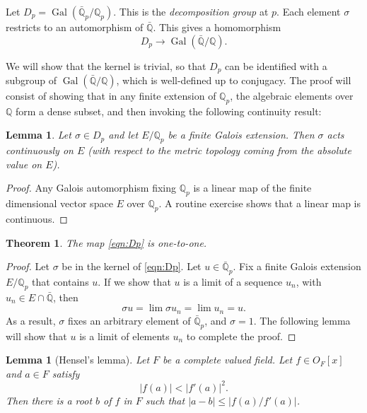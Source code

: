 \documentclass{amsart}
\def\op#1{{\operatorname{#1}}}
\newcommand{\ring}[1]{\mathbb{#1}}
\newtheorem{theorem}[equation]{Theorem}
\newtheorem{lemma}[equation]{Lemma}
\def\newterm#1{{\it #1}}
\def\abs#1{{|#1|}}
\begin{document}
Let $D_p = \op{Gal}(\bar{\ring{Q}}_p/\ring{Q}_p)$.  This is the
\newterm{decomposition group} at $p$.  Each element $\sigma$ restricts
to an automorphism of $\bar{\ring{Q}}$.  This gives a homomorphism
\begin{equation}\label{eqn:Dp}
D_p\to \op{Gal}(\bar{\ring{Q}}/\ring{Q}).
\end{equation}

We will show that the kernel is trivial, so that $D_p$ can be
identified with a subgroup of $\op{Gal}(\bar{\ring{Q}}/\ring{Q})$,
which is well-defined up to conjugacy.  The proof will consist of
showing that in any finite extension of $\ring{Q}_p$, the algebraic
elements over $\ring{Q}$ form a dense subset, and then invoking the
following continuity result:

\begin{lemma} Let $\sigma\in D_p$ and let $E/\ring{Q}_p$ be a finite Galois extension. 
Then $\sigma$ acts continuously on $E$ (with respect to the metric topology coming
from the absolute value on $E$).
\end{lemma}

\begin{proof}  Any Galois automorphism fixing $\ring{Q}_p$ is a linear map of
the finite dimensional vector space $E$ over $\ring{Q}_p$.  A routine exercise
shows that a linear map is continuous.
\end{proof}

\begin{theorem} The map \eqref{eqn:Dp} is one-to-one.
\end{theorem}

\begin{proof}
  Let $\sigma$ be in the kernel of \eqref{eqn:Dp}.  Let $u\in
  \bar{\ring{Q}}_p$.  Fix a finite Galois extension $E/\ring{Q}_p$
  that contains $u$.  If we show that $u$ is a limit of a sequence
  $u_n$, with $u_n\in E\cap \bar{\ring{Q}}$, then
\[
\sigma u = \lim \sigma u_n = \lim u_n = u.
\]
As a result, $\sigma$ fixes an arbitrary element of
$\bar{\ring{Q}}_p$, and $\sigma=1$.  The following lemma will show
that $u$ is a limit of elements $u_n$ to complete the proof.
\end{proof}

\begin{lemma}[Hensel's lemma] Let $F$ be a complete valued field.
Let $f\in O_F[x]$ and $a\in F$ satisfy
\[
\abs{f(a)} < \abs{f'(a)}^2. 
\]
Then there is a root $b$ of $f$ in $F$ such that $\abs{a-b}\le\abs{f(a)/f'(a)}$.
\end{lemma}
\end{document}
